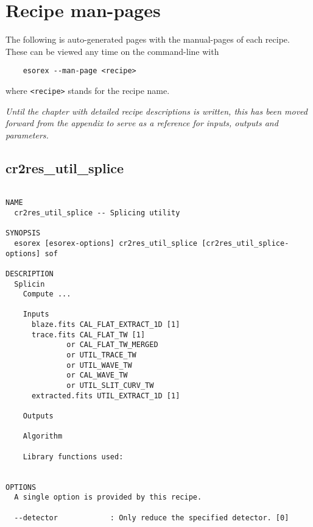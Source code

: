 \section{Recipe man-pages}\label{sec:manpages}
The following is auto-generated pages with the manual-pages
of each recipe. These can be viewed any time on the command-line
with
\begin{verbatim}
    esorex --man-page <recipe>
\end{verbatim}
where \texttt{<recipe>} stands for the recipe name.

\emph{Until the chapter with detailed recipe descriptions is written, this has been moved forward from the appendix to serve as a reference for inputs, outputs and parameters.
}

\subsection{cr2res\_util\_splice}
\begin{verbatim}

NAME
  cr2res_util_splice -- Splicing utility

SYNOPSIS
  esorex [esorex-options] cr2res_util_splice [cr2res_util_splice-options] sof

DESCRIPTION
  Splicin                                                                 
    Compute ...                                                           
                                                                          
    Inputs                                                                
      blaze.fits CAL_FLAT_EXTRACT_1D [1]               
      trace.fits CAL_FLAT_TW [1]                       
              or CAL_FLAT_TW_MERGED                    
              or UTIL_TRACE_TW                         
              or UTIL_WAVE_TW                          
              or CAL_WAVE_TW                           
              or UTIL_SLIT_CURV_TW                     
      extracted.fits UTIL_EXTRACT_1D [1]               
                                                                          
    Outputs                                                               
                                                                          
    Algorithm                                                             
                                                                          
    Library functions used:                                               
  

OPTIONS
  A single option is provided by this recipe.

  --detector            : Only reduce the specified detector. [0]

\end{verbatim}
